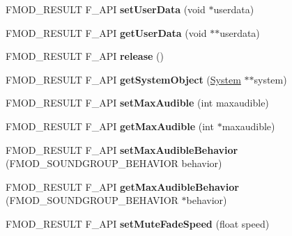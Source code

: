 \begin{DoxyCompactItemize}
F\+M\+O\+D\+\_\+\+R\+E\+S\+U\+LT F\+\_\+\+A\+PI {\bfseries set\+User\+Data} (void $\ast$userdata)
\item 
\mbox{\label{classFMOD_1_1SoundGroup_ac428e826a819030cbab7ffa666d7d9cd}} 
F\+M\+O\+D\+\_\+\+R\+E\+S\+U\+LT F\+\_\+\+A\+PI {\bfseries get\+User\+Data} (void $\ast$$\ast$userdata)
\item 
\mbox{\label{classFMOD_1_1SoundGroup_a184d5ee5cab2f885f21b2e23764e641d}} 
F\+M\+O\+D\+\_\+\+R\+E\+S\+U\+LT F\+\_\+\+A\+PI {\bfseries release} ()
\item 
\mbox{\label{classFMOD_1_1SoundGroup_a2997b6d45663014b03d44bf791d54187}} 
F\+M\+O\+D\+\_\+\+R\+E\+S\+U\+LT F\+\_\+\+A\+PI {\bfseries get\+System\+Object} (\hyperlink{classFMOD_1_1System}{System} $\ast$$\ast$system)
\item 
\mbox{\label{classFMOD_1_1SoundGroup_a8e3b6569d346e94cf3f23d789eae5b5f}} 
F\+M\+O\+D\+\_\+\+R\+E\+S\+U\+LT F\+\_\+\+A\+PI {\bfseries set\+Max\+Audible} (int maxaudible)
\item 
\mbox{\label{classFMOD_1_1SoundGroup_ac63af09a716e9598b04394986e813bbb}} 
F\+M\+O\+D\+\_\+\+R\+E\+S\+U\+LT F\+\_\+\+A\+PI {\bfseries get\+Max\+Audible} (int $\ast$maxaudible)
\item 
\mbox{\label{classFMOD_1_1SoundGroup_a8f13ff7ef4a6e3768af07f3f1c64e3b3}} 
F\+M\+O\+D\+\_\+\+R\+E\+S\+U\+LT F\+\_\+\+A\+PI {\bfseries set\+Max\+Audible\+Behavior} (F\+M\+O\+D\+\_\+\+S\+O\+U\+N\+D\+G\+R\+O\+U\+P\+\_\+\+B\+E\+H\+A\+V\+I\+OR behavior)
\item 
\mbox{\label{classFMOD_1_1SoundGroup_a9da1bb7047b20c8195916518a6bed57b}} 
F\+M\+O\+D\+\_\+\+R\+E\+S\+U\+LT F\+\_\+\+A\+PI {\bfseries get\+Max\+Audible\+Behavior} (F\+M\+O\+D\+\_\+\+S\+O\+U\+N\+D\+G\+R\+O\+U\+P\+\_\+\+B\+E\+H\+A\+V\+I\+OR $\ast$behavior)
\item 
\mbox{\label{classFMOD_1_1SoundGroup_a12f1961024de5e1e4998efe69d01a772}} 
F\+M\+O\+D\+\_\+\+R\+E\+S\+U\+LT F\+\_\+\+A\+PI {\bfseries set\+Mute\+Fade\+Speed} (float speed)
\item 

\end{DoxyCompactItemize}
